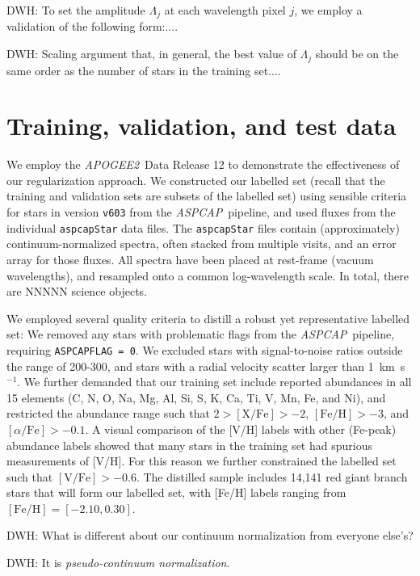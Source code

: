 \documentclass[12pt,preprint]{aastex}
\newcommand{\project}[1]{\textsl{#1}}
\newcommand{\acronym}[1]{{\small{#1}}}
\newcommand{\apogee}{\project{\acronym{APOGEE2}}}
\newcommand{\aspcap}{\project{\acronym{ASPCAP}}}
\begin{document}
DWH: To set the amplitude $\Lambda_j$ at each wavelength pixel $j$, we
employ a validation of the following form:....

DWH: Scaling argument that, in general, the best value of $\Lambda_j$
should be on the same order as the number of stars in the training
set....

\section{Training, validation, and test data}


We employ the \apogee\ Data Release 12 to demonstrate the effectiveness of our 
regularization approach.   We constructed our labelled set (recall that the training and validation sets are subsets of the labelled set) using sensible criteria for  
stars in version \texttt{v603} from the \aspcap\ 
pipeline, and used fluxes from the individual \texttt{aspcapStar} data files.
The \texttt{aspcapStar} files contain (approximately) continuum-normalized 
spectra, often stacked from multiple visits, and an error array for those 
fluxes.  All spectra have been placed at rest-frame (vacuum wavelengths), and
resampled onto a common log-wavelength scale. In total, there are NNNNN science
objects.

We employed several quality criteria to distill a robust yet representative 
labelled set: We removed any stars with problematic flags from the \aspcap\
pipeline, requiring \texttt{ASPCAPFLAG = 0}.  We excluded stars with 
signal-to-noise ratios outside the range of 200-300, and stars with a radial 
velocity scatter larger than 1~km~s$^{-1}$.  We further demanded that
our training set include reported abundances in all 15 elements (C, N, O, Na, 
Mg, Al, Si, S, K, Ca, Ti, V, Mn, Fe, and Ni), and restricted the abundance range
such that $2 > \mathrm{[X/Fe]} > -2$, $\mathrm{[Fe/H]} > -3$, and 
$[\alpha/\mathrm{Fe}] > -0.1$.  A visual comparison of the [V/H] labels
with other (Fe-peak) abundance labels showed that many stars in the training set had
spurious measurements of [V/H]. For this reason we further constrained the
labelled set such that $\mathrm{[V/Fe]} > -0.6$.  The distilled sample
includes 14,141 red giant branch stars that will form our labelled set, with [Fe/H] labels ranging from
$\mathrm{[Fe/H]} = [-2.10, 0.30]$. 


DWH: What is different about our continuum normalization from everyone else's?

DWH: It is \emph{pseudo-continuum normalization}.
\end{document}
